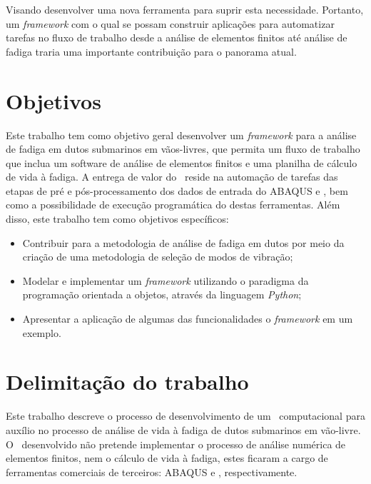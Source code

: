 Visando desenvolver uma nova ferramenta para suprir esta necessidade. Portanto, um \textit{framework} com o qual se possam construir aplicações para automatizar tarefas no fluxo de trabalho desde a análise de elementos finitos até análise de fadiga traria uma importante contribuição para o panorama atual.


\section{Objetivos}


Este trabalho tem como objetivo geral desenvolver um \textit{framework} para a análise de fadiga em dutos submarinos em vãos-livres, que permita um fluxo de trabalho que inclua um software de análise de elementos finitos e uma planilha de cálculo de vida à fadiga. A entrega de valor do \frame\ reside na automação de tarefas das etapas de pré e pós-processamento dos dados de entrada do ABAQUS e \fatfree, bem como a possibilidade de execução programática do destas ferramentas.
Além disso, este trabalho tem como objetivos específicos:

\begin{itemize}
    \item Contribuir para a metodologia de análise de fadiga em dutos por meio da criação de uma metodologia de seleção de modos de vibração;
    \item Modelar e implementar um \textit{framework} utilizando o paradigma da programação orientada a objetos, através da linguagem \textit{Python};
    \item Apresentar a aplicação de algumas das funcionalidades o \textit{framework} em um exemplo.
\end{itemize}


\section{Delimitação do trabalho}


Este trabalho descreve o processo de desenvolvimento de um \frame\ computacional para auxílio no processo de análise de vida à fadiga de dutos submarinos em vão-livre. O \frame\ desenvolvido não pretende implementar o processo de análise numérica de elementos finitos, nem o cálculo de vida à fadiga, estes ficaram a cargo de ferramentas comerciais de terceiros: ABAQUS e \fatfree, respectivamente.



